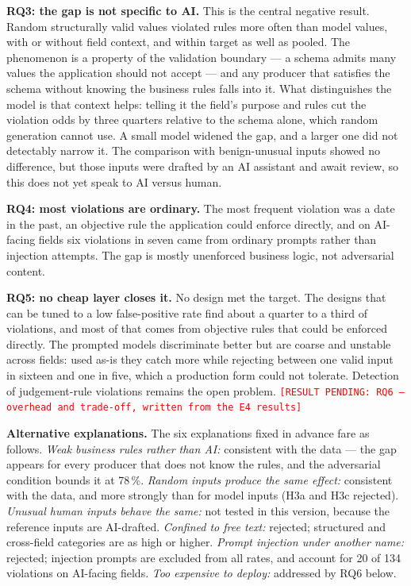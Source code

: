 \documentclass[conference]{IEEEtran}
\newcommand{\pending}[1]{\textcolor{red}{\texttt{[RESULT PENDING: #1]}}}
\begin{document}
\textbf{RQ3: the gap is not specific to AI.} This is the central negative result. Random structurally
valid values violated rules more often than model values, with or without field context, and within
target as well as pooled. The phenomenon is a property of the validation boundary --- a schema admits
many values the application should not accept --- and any producer that satisfies the schema without
knowing the business rules falls into it. What distinguishes the model is that context helps: telling
it the field's purpose and rules cut the violation odds by three quarters relative to the schema
alone, which random generation cannot use. A small model widened the gap, and a larger one did not
detectably narrow it. The comparison with benign-unusual inputs showed no difference, but those
inputs were drafted by an AI assistant and await review, so this does not yet speak to AI versus
human.

\textbf{RQ4: most violations are ordinary.} The most frequent violation was a date in the past, an
objective rule the application could enforce directly, and on AI-facing fields six violations in
seven came from ordinary prompts rather than injection attempts. The gap is mostly unenforced business
logic, not adversarial content.

\textbf{RQ5: no cheap layer closes it.} No design met the target. The designs that can be tuned to a
low false-positive rate find about a quarter to a third of violations, and most of that comes from
objective rules that could be enforced directly. The prompted models discriminate better but are
coarse and unstable across fields: used as-is they catch more while rejecting between one valid input
in sixteen and one in five, which a production form could not tolerate. Detection of judgement-rule
violations remains the open problem.
\pending{RQ6 --- overhead and trade-off, written from the E4 results}

\textbf{Alternative explanations.} The six explanations fixed in advance fare as follows. \emph{Weak
business rules rather than AI:} consistent with the data --- the gap appears for every producer that does not know the
rules, and the adversarial condition bounds it at 78\,\%. \emph{Random inputs produce the same
effect:} consistent with the data, and more strongly than for model inputs (H3a and H3c rejected). \emph{Unusual
human inputs behave the same:} not tested in this version, because the reference inputs are
AI-drafted. \emph{Confined to free text:} rejected; structured and cross-field categories are as high
or higher. \emph{Prompt injection under another name:} rejected; injection prompts are excluded from
all rates, and account for 20 of 134 violations on AI-facing fields. \emph{Too expensive to deploy:}
addressed by RQ6 below.
\end{document}

